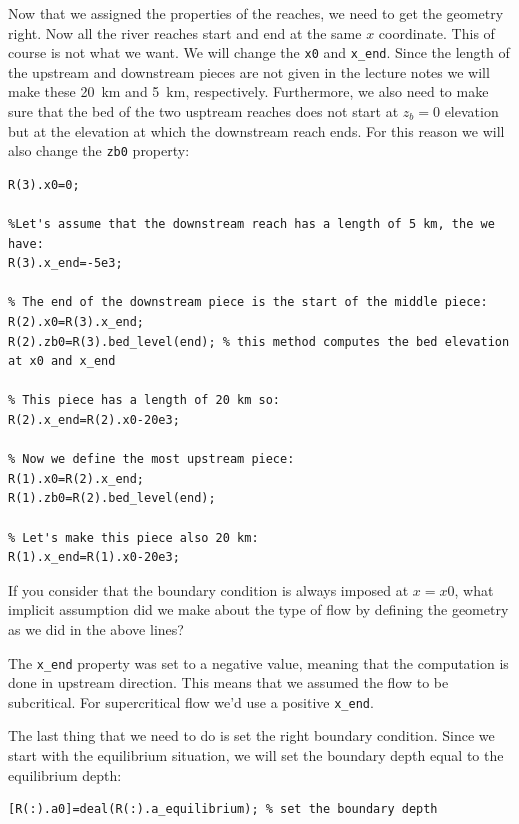 \documentclass[a4paper]{article}
\begin{document}
Now that we assigned the properties of the reaches, we need to get the geometry right. Now all the river reaches start and end at the same $x$ coordinate. This of course is not what we want. We will change the \lstinline{x0} and \lstinline{x_end}. Since the length of the upstream and downstream pieces are not given in the lecture notes we will make these \SI{20}{\km} and \SI{5}{\km}, respectively. Furthermore, we also need to make sure that the bed of the two usptream reaches does not start at $z_b=0$ elevation but at the elevation at which the downstream reach ends. For this reason we will also change the \lstinline{zb0} property:
\begin{lstlisting}
R(3).x0=0;

%Let's assume that the downstream reach has a length of 5 km, the we have:
R(3).x_end=-5e3;

% The end of the downstream piece is the start of the middle piece:
R(2).x0=R(3).x_end;
R(2).zb0=R(3).bed_level(end); % this method computes the bed elevation at x0 and x_end

% This piece has a length of 20 km so:
R(2).x_end=R(2).x0-20e3;

% Now we define the most upstream piece:
R(1).x0=R(2).x_end;
R(1).zb0=R(2).bed_level(end);

% Let's make this piece also 20 km:
R(1).x_end=R(1).x0-20e3;
\end{lstlisting}

\begin{exercise}
  If you consider that the boundary condition is always imposed at $x=x0$, what implicit assumption did we make about the type of flow by defining the geometry as we did in the above lines?
\end{exercise}

\begin{solution}
    The \lstinline|x_end| property was set to a negative value, meaning that the computation is done in upstream direction. This means that we assumed the flow to be subcritical. For supercritical flow we'd use a positive \lstinline|x_end|.
\end{solution}

The last thing that we need to do is set the right boundary condition. Since we start with the equilibrium situation, we will set the boundary depth equal to the equilibrium depth:

\begin{lstlisting}
[R(:).a0]=deal(R(:).a_equilibrium); % set the boundary depth
\end{lstlisting}
\end{document}
